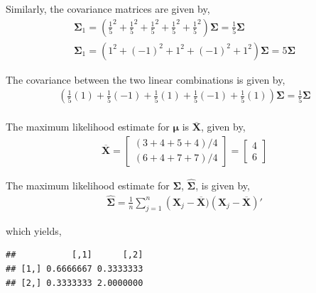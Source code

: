 \documentclass[12pt]{article}\usepackage[]{graphicx}\usepackage[]{color}
\makeatletter
\newenvironment{kframe}{%
 \def\at@end@of@kframe{}%
 \ifinner\ifhmode%
  \def\at@end@of@kframe{\end{minipage}}%
  \begin{minipage}{\columnwidth}%
 \fi\fi%
 \def\FrameCommand##1{\hskip\@totalleftmargin \hskip-\fboxsep
 \colorbox{shadecolor}{##1}\hskip-\fboxsep
     \hskip-\linewidth \hskip-\@totalleftmargin \hskip\columnwidth}%
 \MakeFramed {\advance\hsize-\width
   \@totalleftmargin\z@ \linewidth\hsize
   \@setminipage}}%
 {\par\unskip\endMakeFramed%
 \at@end@of@kframe}
\newenvironment{knitrout}{}{} %
\newenvironment{problem}[2][Problem]{\begin{trivlist}
\item[\hskip \labelsep {\bfseries #1}\hskip \labelsep {\bfseries #2.}]}{\end{trivlist}}
\newcommand{\vct}{\mathbf}
\makeatother
\begin{document}
Similarly, the covariance matrices are given by,
\begin{align*}
\vct{\Sigma}_1 = \left(\frac{1}{5}^2 + \frac{1}{5}^2 + \frac{1}{5}^2 + \frac{1}{5}^2 + \frac{1}{5}^2\right)\vct{\Sigma} = \frac{1}{5}\vct{\Sigma}\\
\vct{\Sigma}_1 = \left(1^2 + (-1)^2 + 1^2 + (-1)^2 + 1^2\right)\vct{\Sigma} = 5\vct{\Sigma}
\end{align*}

The covariance between the two linear combinations is given by,
\begin{align*}
\left(\frac{1}{5}(1) + \frac{1}{5}(-1) + \frac{1}{5}(1) + \frac{1}{5}(-1) + \frac{1}{5}(1)\right)\vct{\Sigma} = \frac{1}{5}\vct{\Sigma}\\
\end{align*}


\begin{problem}{4.18}
\end{problem}

The maximum likelihood estimate for $\vct{\mu}$ is $\overline{\vct{X}}$, given by,
\begin{align*}
\overline{\vct{X}} = \begin{bmatrix} (3+4+5+4)/4 \\ (6+4+7+7)/4 \end{bmatrix} = \begin{bmatrix} 4 \\ 6 \end{bmatrix}
\end{align*}

The maximum likelihood estimate for $\vct{\Sigma}$, $\hat{\vct{\Sigma}}$, is given by,
\begin{align*}
\hat{\vct{\Sigma}} = \frac{1}{n}\sum_{j = 1}^n\left(\vct{X}_j - \overline{\vct{X}})(\vct{X}_j - \overline{\vct{X}})'
\end{align*}

which yields,
\begin{knitrout}
\color{fgcolor}\begin{kframe}
\begin{verbatim}
##           [,1]      [,2]
## [1,] 0.6666667 0.3333333
## [2,] 0.3333333 2.0000000
\end{verbatim}
\end{kframe}
\end{knitrout}
\end{document}
